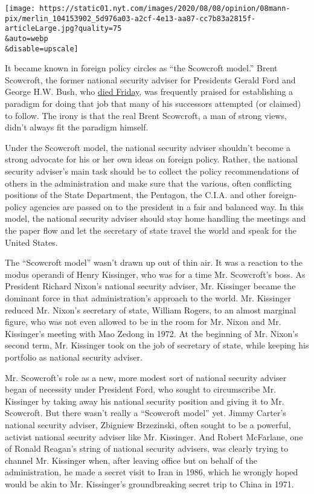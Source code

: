 \texttt{[image: https://static01.nyt.com/images/2020/08/08/opinion/08mann-pix/merlin\_104153902\_5d976a03-a2cf-4e13-aa87-cc7b83a2815f-articleLarge.jpg?quality=75\\\&auto=webp\\\&disable=upscale]}

It became known in foreign policy circles as ``the Scowcroft model.''
Brent Scowcroft, the former national security adviser for Presidents
Gerald Ford and George H.W. Bush, who
\href{https://www.nytimes.com/2020/08/07/us/politics/brent-scowcroft-dead.html}{died
Friday}, was frequently praised for establishing a paradigm for doing
that job that many of his successors attempted (or claimed) to follow.
The irony is that the real Brent Scowcroft, a man of strong views,
didn't always fit the paradigm himself.

Under the Scowcroft model, the national security adviser shouldn't
become a strong advocate for his or her own ideas on foreign policy.
Rather, the national security adviser's main task should be to collect
the policy recommendations of others in the administration and make sure
that the various, often conflicting positions of the State Department,
the Pentagon, the C.I.A. and other foreign-policy agencies are passed on
to the president in a fair and balanced way. In this model, the national
security adviser should stay home handling the meetings and the paper
flow and let the secretary of state travel the world and speak for the
United States.

The ``Scowcroft model'' wasn't drawn up out of thin air. It was a
reaction to the modus operandi of Henry Kissinger, who was for a time
Mr. Scowcroft's boss. As President Richard Nixon's national security
adviser, Mr. Kissinger became the dominant force in that
administration's approach to the world. Mr. Kissinger reduced Mr.
Nixon's secretary of state, William Rogers, to an almost marginal
figure, who was not even allowed to be in the room for Mr. Nixon and Mr.
Kissinger's meeting with Mao Zedong in 1972. At the beginning of Mr.
Nixon's second term, Mr. Kissinger took on the job of secretary of
state, while keeping his portfolio as national security adviser.

Mr. Scowcroft's role as a new, more modest sort of national security
adviser began of necessity under President Ford, who sought to
circumscribe Mr. Kissinger by taking away his national security position
and giving it to Mr. Scowcroft. But there wasn't really a ``Scowcroft
model'' yet. Jimmy Carter's national security adviser, Zbigniew
Brzezinski, often sought to be a powerful, activist national security
adviser like Mr. Kissinger. And Robert McFarlane, one of Ronald Reagan's
string of national security advisers, was clearly trying to channel Mr.
Kissinger when, after leaving office but on behalf of the
administration, he made a secret visit to Iran in 1986, which he wrongly
hoped would be akin to Mr. Kissinger's groundbreaking secret trip to
China in 1971.

